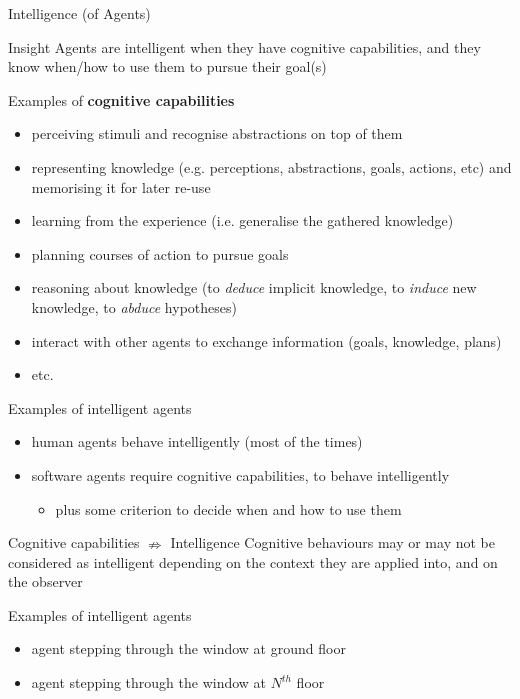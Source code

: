 \documentclass[presentation]{beamer}\mode<presentation>{\usetheme{AMSBolognaFC}}
\begin{document}
\begin{frame}[c,allowframebreaks]{Intelligence (of Agents)}
%
\begin{block}{Insight}
	Agents are \alert{intelligent} when they have \alert{cognitive capabilities}, and they know when/how to use them to pursue their goal(s)
\end{block}
%
\begin{exampleblock}{Examples of \textbf{cognitive capabilities}}\small
	\begin{itemize}
		\item \alert{perceiving} stimuli and \alert{recognise} abstractions on top of them
		\item \alert{representing knowledge} (e.g. perceptions, abstractions, goals, actions, etc) and \alert{memorising} it for later re-use
		\item \alert{learning} from the experience (i.e. generalise the gathered knowledge)
		\item \alert{planning} courses of action to pursue goals
		\item \alert{reasoning} about knowledge (to \emph{deduce} implicit knowledge, to \emph{induce} new knowledge, to \emph{abduce} hypotheses)
		\item \alert{interact} with other agents to exchange information (goals, knowledge, plans)
		\item etc.
	\end{itemize}
\end{exampleblock}
%
\begin{exampleblock}{Examples of intelligent agents}
	\begin{itemize}
		\item human agents behave intelligently (most of the times)
		\item software agents require cognitive capabilities, to behave intelligently
		\begin{itemize}
			\item plus some criterion to decide when and how to use them
		\end{itemize}
	\end{itemize}
\end{exampleblock}
%
\framebreak
%
\begin{alertblock}{Cognitive capabilities $\nRightarrow$ Intelligence}
	Cognitive behaviours may or may not be considered as intelligent depending on the \alert{context} they are applied into, and on the \alert{observer}
\end{alertblock}
%
\begin{exampleblock}{Examples of intelligent agents}
	\begin{itemize}
		\item agent stepping through the window at ground floor
		\item agent stepping through the window at $N^{th}$ floor
	\end{itemize}
\end{exampleblock}
%
\end{frame}
\end{document}
